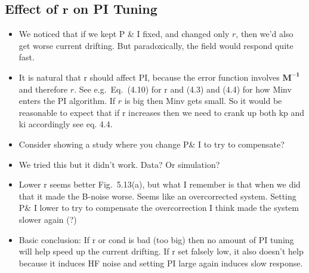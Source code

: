 
% 

\subsection{Effect of $\mathbf{r}$ on PI Tuning}\label{sec:r_pi}


\begin{itemize}
\item We noticed that if we kept P \& I fixed, and changed only $r$, then we'd also get worse current drifting.  But paradoxically, the field would respond quite fast.
\item It is natural that r should affect PI, because the error function involves $\mathbf{M^{-1}}$ and therefore $r$.  See e.g.~Eq.~(4.10) for r and (4.3) and (4.4) for how Minv enters the PI algorithm.  If $r$ is big then Minv gets small.  So it would be reasonable to expect that if r increases then we need to crank up both kp and ki accordingly see eq. 4.4.
\item Consider showing a study where you change P\& I to try to compensate?
\item We tried this but it didn't work.  Data?  Or simulation?
\item Lower r seems better Fig.~5.13(a), but what I remember is that when we did that it made the B-noise worse.  Seems like an overcorrected system.  Setting P\& I lower to try to compensate the overcorrection I think made the system slower again (?)
\item Basic conclusion:  If r or cond is bad (too big) then no amount of PI tuning will help speed up the current drifting.  If r set falsely low, it also doesn't help because it induces HF noise and setting PI large again induces slow response.
\end{itemize}

